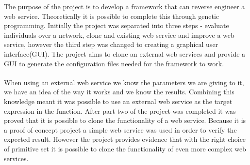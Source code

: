 The purpose of the project is to develop a framework that can reverse engineer a web service.
Theoretically it is possible to complete this through genetic programming. Initially the project
was separated into three steps - evaluate individuals over a network, clone and existing web service and improve a
web service, however the third step was changed to creating a graphical user interface(GUI). The project aims to clone an external web services and provide a GUI to
generate the configuration files needed for the framework to work.
\paragraph{}
When using an external web service we know the parameters we are giving to it, we have an idea of the way it 
works and we know the results. Combining this knowledge meant it was possible to use an external web service as the target expression in
the function. After part two of the project
was completed it was proved that it is possible to clone the functionality of a web service. Because it is a proof of concept
project a simple web service was used in order to verify the expected result. However the project provides evidence that with the right
choice of primitive set it is possible to clone the functionality of even more complex web services.
